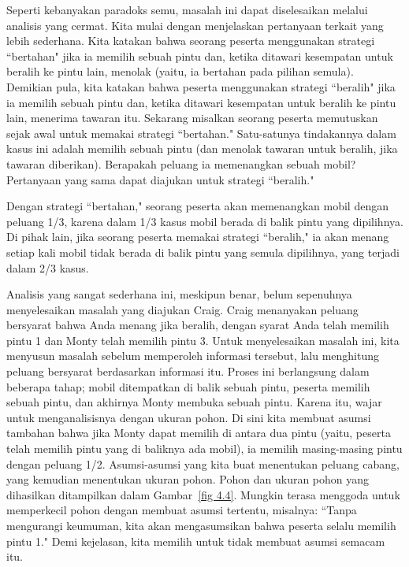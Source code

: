 \begin{example}
Seperti kebanyakan paradoks semu, masalah ini dapat diselesaikan melalui analisis yang cermat.
Kita mulai dengan menjelaskan pertanyaan terkait yang lebih sederhana.  Kita katakan bahwa seorang peserta menggunakan
strategi ``bertahan" jika ia memilih sebuah pintu dan, ketika ditawari kesempatan untuk beralih ke pintu lain,
menolak (yaitu, ia bertahan pada pilihan semula).  Demikian pula, kita katakan bahwa
peserta menggunakan strategi ``beralih" jika ia memilih sebuah pintu dan, ketika ditawari kesempatan untuk beralih ke
pintu lain, menerima tawaran itu.  Sekarang misalkan seorang peserta memutuskan sejak awal untuk memakai
strategi ``bertahan."  Satu-satunya tindakannya dalam kasus ini adalah memilih sebuah pintu (dan menolak tawaran untuk
beralih, jika tawaran diberikan).  Berapakah peluang ia memenangkan sebuah mobil?  Pertanyaan yang sama
dapat diajukan untuk strategi ``beralih."  
\par
Dengan strategi ``bertahan," seorang peserta akan memenangkan mobil dengan peluang 1/3, karena dalam 1/3
kasus mobil berada di balik pintu yang dipilihnya.  Di pihak lain, jika seorang peserta memakai
strategi ``beralih," ia akan menang setiap kali mobil tidak berada di balik pintu yang semula
dipilihnya, yang terjadi dalam 2/3 kasus.  
\par
Analisis yang sangat sederhana ini, meskipun benar, belum sepenuhnya menyelesaikan masalah yang diajukan Craig.  Craig
menanyakan peluang bersyarat bahwa Anda menang jika beralih, dengan syarat Anda telah memilih pintu 1
dan Monty telah memilih pintu 3.  Untuk menyelesaikan masalah ini, kita menyusun masalah sebelum
memperoleh informasi tersebut, lalu menghitung peluang bersyarat berdasarkan informasi itu. 
Proses ini berlangsung dalam beberapa tahap; mobil ditempatkan di balik sebuah pintu, peserta
memilih sebuah pintu, dan akhirnya Monty membuka sebuah pintu.  Karena itu, wajar untuk menganalisisnya dengan ukuran
pohon.  Di sini kita membuat asumsi tambahan bahwa jika Monty dapat memilih di antara dua pintu (yaitu,
peserta telah memilih pintu yang di baliknya ada mobil), ia memilih masing-masing pintu dengan peluang
1/2.  Asumsi-asumsi yang kita buat menentukan peluang cabang, yang kemudian menentukan
ukuran pohon. Pohon dan ukuran pohon yang dihasilkan ditampilkan dalam Gambar~\ref{fig 4.4}.  Mungkin terasa menggoda untuk
memperkecil pohon dengan membuat asumsi tertentu, misalnya: ``Tanpa mengurangi keumuman, kita
akan mengasumsikan bahwa peserta selalu memilih pintu 1."  Demi kejelasan, kita memilih untuk tidak membuat
asumsi semacam itu.  


\end{example}
